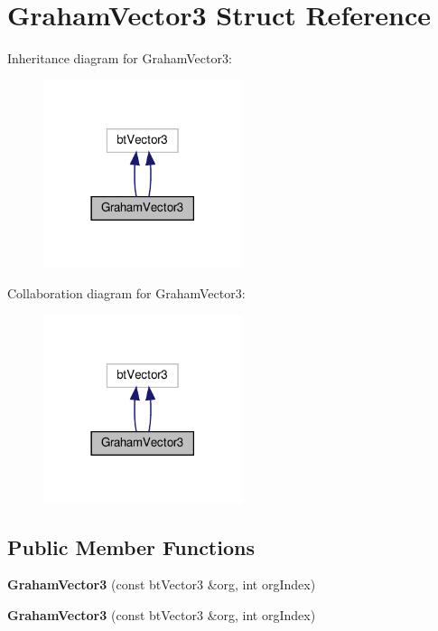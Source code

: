 \hypertarget{structGrahamVector3}{}\section{Graham\+Vector3 Struct Reference}
\label{structGrahamVector3}


Inheritance diagram for Graham\+Vector3\+:
\nopagebreak
\begin{figure}[H]
\begin{center}
\leavevmode
\includegraphics[width=165pt]{structGrahamVector3__inherit__graph}
\end{center}
\end{figure}


Collaboration diagram for Graham\+Vector3\+:
\nopagebreak
\begin{figure}[H]
\begin{center}
\leavevmode
\includegraphics[width=165pt]{structGrahamVector3__coll__graph}
\end{center}
\end{figure}
\subsection*{Public Member Functions}
\begin{DoxyCompactItemize}
\item 
\mbox{\label{structGrahamVector3_a8938d952ebb13495df3a293e3e399370}} 
{\bfseries Graham\+Vector3} (const bt\+Vector3 \&org, int org\+Index)
\item 
\mbox{\label{structGrahamVector3_a8938d952ebb13495df3a293e3e399370}} 
{\bfseries Graham\+Vector3} (const bt\+Vector3 \&org, int org\+Index)
\end{DoxyCompactItemize}
